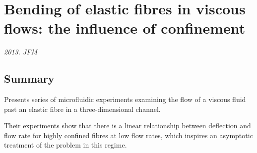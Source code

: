 \documentclass[preprint, letterpaper, nobibnotes, aps, superscriptaddress,prb]{revtex4-1}
\begin{document}
\section{Bending of elastic fibres in viscous flows: the influence of confinement}

\textit{2013. JFM}

\subsection{Summary}
Presents series of microfluidic experiments examining the flow of a viscous fluid past an elastic fibre in a three-dimensional channel.

Their experiments show that there is a linear relationship
between deflection and flow rate for highly confined fibres at low flow rates, which
inspires an asymptotic treatment of the problem in this regime. 
\end{document}
